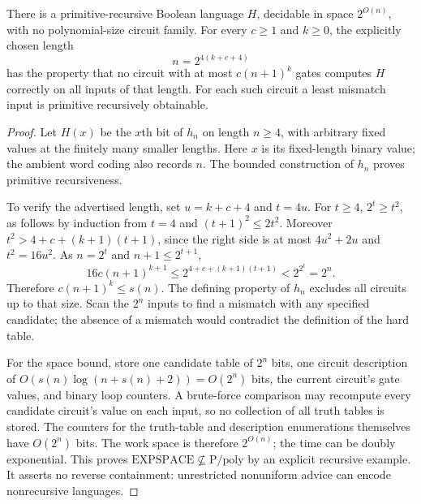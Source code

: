 \begin{corollary}
\label{thm:R12}
There is a primitive-recursive Boolean language $H$, decidable in
space $2^{O(n)}$, with no polynomial-size circuit family. For every
$c\geq1$ and $k\geq0$, the explicitly chosen length
\[
 n=2^{4(k+c+4)}
\]
has the property that no circuit with at most $c(n+1)^k$ gates computes
$H$ correctly on all inputs of that length. For each such circuit a least
mismatch input is primitive recursively obtainable.
\end{corollary}
\begin{proof}
Let $H(x)$ be the $x$th bit of $h_n$ on length $n\geq4$, with arbitrary
fixed values at the finitely many smaller lengths. Here $x$ is its
fixed-length binary value; the ambient word coding also records $n$.
The bounded construction of $h_n$ proves primitive recursiveness.

To verify the advertised length, set $u=k+c+4$ and $t=4u$. For $t\geq4$,
$2^t\geq t^2$, as follows by induction from $t=4$ and
$(t+1)^2\leq2t^2$. Moreover
$t^2>4+c+(k+1)(t+1)$, since the right side is at most
$4u^2+2u$ and $t^2=16u^2$. As $n=2^t$ and $n+1\leq2^{t+1}$,
\[
 16c(n+1)^{k+1}
 \leq2^{4+c+(k+1)(t+1)}<2^{2^t}=2^n.
\]
Therefore $c(n+1)^k\leq s(n)$. The defining property of $h_n$ excludes
all circuits up to that size. Scan the $2^n$ inputs to find a mismatch
with any specified candidate; the absence of a mismatch would contradict
the definition of the hard table.

For the space bound, store one candidate table of $2^n$ bits, one circuit
description of $O(s(n)\log(n+s(n)+2))=O(2^n)$ bits, the current circuit's
gate values, and binary loop counters. A brute-force comparison may
recompute every candidate circuit's value on each input, so no collection
of all truth tables is stored. The counters for the truth-table and
description enumerations themselves have $O(2^n)$ bits. The work space
is therefore $2^{O(n)}$; the time can be doubly exponential. This proves
$\mathrm{EXPSPACE}\not\subseteq\mathrm P/\mathrm{poly}$ by an explicit
recursive example. It asserts no reverse containment: unrestricted
nonuniform advice can encode nonrecursive languages.
\end{proof}

